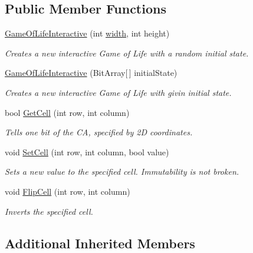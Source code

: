 \subsection*{Public Member Functions}
\begin{DoxyCompactItemize}
\item 
\hyperlink{class_cellular_1_1_game_of_life_interactive_a236130c31aa7f599fb4f351d986ed9a2}{Game\+Of\+Life\+Interactive} (int \hyperlink{class_cellular_1_1_automaton2_d_a1e9e5ec637c747a859c346839c90d174}{width}, int height)
\begin{DoxyCompactList}\small\item\em Creates a new interactive Game of Life with a random initial state. \end{DoxyCompactList}\item 
\hyperlink{class_cellular_1_1_game_of_life_interactive_a942680313b546fc96e0e597539eb38b6}{Game\+Of\+Life\+Interactive} (Bit\+Array\mbox{[}$\,$\mbox{]} initial\+State)
\begin{DoxyCompactList}\small\item\em Creates a new interactive Game of Life with givin initial state. \end{DoxyCompactList}\item 
bool \hyperlink{class_cellular_1_1_game_of_life_interactive_a303ef8311575b8d401087db7ebbefd37}{Get\+Cell} (int row, int column)
\begin{DoxyCompactList}\small\item\em Tells one bit of the C\+A, specified by 2\+D coordinates. \end{DoxyCompactList}\item 
void \hyperlink{class_cellular_1_1_game_of_life_interactive_ab1de892e87ba532605402c4e8472495c}{Set\+Cell} (int row, int column, bool value)
\begin{DoxyCompactList}\small\item\em Sets a new value to the specified cell. Immutability is not broken. \end{DoxyCompactList}\item 
void \hyperlink{class_cellular_1_1_game_of_life_interactive_ae6dad1f3c0ab1b3c16d01d84a678fcfa}{Flip\+Cell} (int row, int column)
\begin{DoxyCompactList}\small\item\em Inverts the specified cell. \end{DoxyCompactList}\end{DoxyCompactItemize}
\subsection*{Additional Inherited Members}


